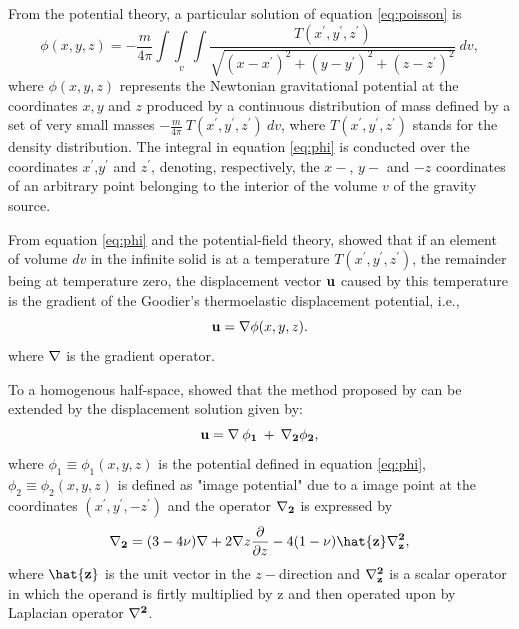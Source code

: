 \documentclass[journal abbreviation, manuscript]{copernicus}
\begin{document}
From the potential theory, a particular  solution of equation \ref{eq:poisson} is
\begin{equation}
\phi(x,y,z) = -  \frac{m}{4 \pi} \int\int\limits_{v}\int \frac{T(x^{\prime}, y^{\prime}, z^{\prime} )}{\sqrt{(x - x^{\prime})^{2} + (y - y^{\prime})^{2} + (z - z^{\prime})^{2}}} \: dv,
\label{eq:phi}
\end{equation}
where $\phi(x,y,z)$ represents the Newtonian gravitational potential \citep{Kellogg29} at the coordinates $x, y$ and $z$ produced by a continuous distribution of mass defined by a set of very small masses $ -  \frac{m}{4 \pi}  \: T( x^{\prime}, y^{\prime}, z^{\prime} ) \: dv$, where $T(x^{\prime}, y^{\prime}, z^{\prime}) $ stands for the density distribution. 
The integral in equation \ref{eq:phi} is conducted over the coordinates $x^{\prime}$,$y^{\prime}$ and $z^{\prime}$, denoting, respectively, the $x-$, $y-$ and $-z$ coordinates of an arbitrary point belonging to the interior of the volume $v$ of the gravity source. 


From equation \ref{eq:phi} and the potential-field theory, \citet{Goodier37} showed that if an element of volume $dv$ in the infinite solid is at a temperature $T(x^{\prime}, y^{\prime}, z^{\prime}) $, the remainder being at temperature zero, the displacement vector $\bf{u}$ caused by this temperature is the gradient of the Goodier’s thermoelastic displacement potential, i.e.,
\begin{equation}
{\bf{u}} = {\bf {\nabla}} \phi(x,y,z). 
\label{eq:displacement-general}
\end{equation}
where $\bf{\nabla}$ is the gradient operator.  

To a homogenous half-space, \citet{Mindlin&Cheng50} showed that the method proposed by  \citet{Goodier37}  can be extended by the displacement solution given by:
\begin{equation}
\bf{u} = {\bf{\nabla}} \: \phi_{1} \: + \: {\bf{{\nabla}_{2}}} \phi_{2}, 
\label{eq:displacement-solution}
\end{equation}
where $\phi_{1} \equiv \phi_{1}(x,y,z)$ is the potential defined in equation \ref{eq:phi}, 
$\phi_{2} \equiv  \phi_{2}(x,y,z)$
is defined as "image potential" \citep{Segall92} due to a image point at the coordinates
$(x^{\prime}, y^{\prime}, -z^{\prime} )$ and the operator $\bf{{\nabla}_{2}}$ is expressed by
\begin{equation}
{\bf{{\nabla}_{2}}} = (3 - 4\nu){\bf{\nabla}} + 2 {\bf{\nabla}} z \frac{\partial }{\partial z}  - 4(1- \nu){\bf{\hat{z}}} {\bf{{\nabla}^{2}_{z}}},
\label{eq:nabla2}
\end{equation}
where ${\bf{\hat{z}}}$ is the unit vector in the $z-$direction and 
${\bf{{\nabla}^{2}_{z}}}$ is a scalar operator in which the operand is firtly multiplied by z and then operated upon by Laplacian operator ${\bf{\nabla}^{2}}$. 
\end{document}
